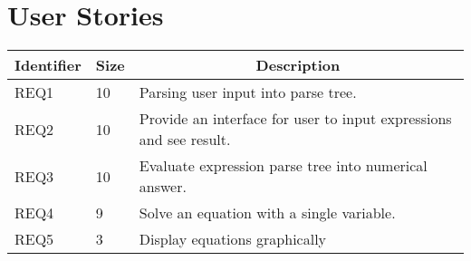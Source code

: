 \documentclass[letterpaper]{article}
\begin{document}
\section{User Stories}
\begin{tabular}{|l|l|l|}
\hline
\multicolumn{1}{|c|}{\textbf{Identifier}} & \multicolumn{1}{c|}{\textbf{Size}} & \multicolumn{1}{c|}{\textbf{Description}} \\ \hline
REQ1 & 10 & Parsing user input into parse tree. \\ \hline
REQ2 & 10 & Provide an interface for user to input expressions and see result.\\ \hline
REQ3 & 10 & Evaluate expression parse tree into numerical answer. \\ \hline
REQ4 & 9  & Solve an equation with a single variable. \\ \hline
REQ5 & 3  & Display equations graphically \\ \hline
\end{tabular}
\end{document}
